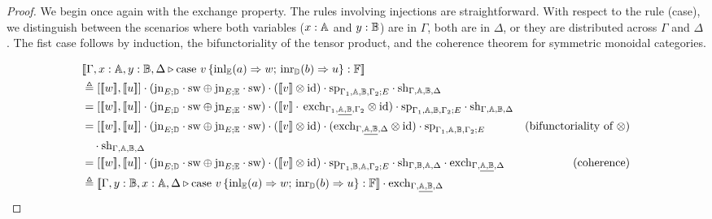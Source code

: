 \documentclass[10pt,a4paper]{amsart}
\theoremstyle{definition}
\theoremstyle{definition}
\theoremstyle{definition}
\theoremstyle{definition}
\theoremstyle{definition}
\theoremstyle{definition}
\begin{document}
\begin{proof}
  We begin once again with the exchange property. The rules involving injections are straightforward. With respect to the rule (case), we distinguish between the scenarios where both variables ($x : \mathbb{A}$ and $y : \mathbb{B}$) are in $\Gamma$, both are in $\Delta$, or they are distributed across $\Gamma$ and $\Delta$.
  The fist case follows by induction, the bifunctoriality of the tensor product, and the coherence theorem for symmetric monoidal categories.



  \begin{align*}
    & [\![\Gamma,x:\typeA, y:\typeB, \Delta \vljud \text{case }  v\,  \{\text{inl}_{\typeE} (a) \Rightarrow w ;\, \text{inr}_{\typeD} (b) \Rightarrow u\}: \typeF]\!] \\ 
    &\triangleq     \left[[\![ w ]\!] ,[\![ u ]\!]\right] \comp (\text{jn}_{E;\typeD}\comp \sw \oplus \text{jn}_{E;\typeE } \comp \sw) \comp ([\![ v  ]\!] \otimes \text{id})  \comp \text{sp}_{\Gamma_{1},\typeA, \typeB,\Gamma_{2};E} \comp \text{sh}_{\Gamma,\typeA, \typeB,\Delta} \\
    & =  \left[[\![ w ]\!] ,[\![ u ]\!]\right] \comp (\text{jn}_{E;\typeD}\comp \sw \oplus \text{jn}_{E;\typeE } \comp \sw)  \comp ([\![v]\! ]\comp\, \text{exch}_{\Gamma_{1}, \underline{\typeA,\typeB},\Gamma_{2}} \otimes \text{id}) \comp \text{sp}_{\Gamma_{1},\typeA, \typeB,\Gamma_{2};E} \comp \text{sh}_{\Gamma,\typeA, \typeB,\Delta} \\
    &  =  \left[[\![ w ]\!] ,[\![ u ]\!]\right] \comp (\text{jn}_{E;\typeD}\comp \sw \oplus \text{jn}_{E;\typeE } \comp \sw)  \comp ([\![ v ]\!]\otimes \text{id}) \comp (\text{exch}_{\Gamma,  \underline{\typeA,  \typeB}, \Delta} \otimes \text{id}) \comp \text{sp}_{\Gamma_{1},\typeA,\typeB, \Gamma_{2};E}  & {\text{(bifunctoriality of $\otimes$)}}\\
    & \hspace{10pt} \comp  \text{sh}_{\Gamma,\typeA, \typeB,\Delta} \\
    & =    \left[[\![ w ]\!] ,[\![ u ]\!]\right] \comp (\text{jn}_{E;\typeD}\comp \sw \oplus \text{jn}_{E;\typeE } \comp \sw)   \comp ([\![v]\!]\otimes \text{id}) \comp \text{sp}_{\Gamma_{1},\typeB,\typeA, \Gamma_{2};E}  \comp \text{sh}_{\Gamma,\typeB, \typeA,\Delta}  \comp \text{exch}_{\Gamma,  \underline{\typeA,\typeB}, \Delta} & {\text{(coherence)}} \\
    & \triangleq   [\![\Gamma,y:\typeB, x:\typeA, \Delta \vljud \text{case } v\,  \{\text{inl}_{\typeE} (a) \Rightarrow w ;\, \text{inr}_{\typeD} (b) \Rightarrow u\}: \typeF]\!] \comp \text{exch}_{\Gamma,  \underline{\typeA, \typeB}, \Delta}
  \end{align*}



\end{proof}
\end{document}

